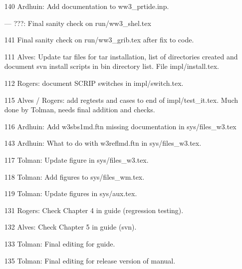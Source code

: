 \begin{itemize}
\item[140] Ardhuin: Add documentation to ww3\_prtide.inp.

\item[---] ???: Final sanity check on run/ww3\_shel.tex

\item[141] Final sanity check on run/ww3\_grib.tex after fix to code.

\item[111] Alves: Update tar files for tar installation, list of directories
  created and document svn install scripts in bin directory list. File
  impl/install.tex. 

\item[112] Rogers: document SCRIP switches in impl/switch.tex.

\item[115] Alves / Rogers: add regtests and cases to end of
  impl/test\_it.tex. Much done by Tolman, needs final addition and checks. 

\item[116] Ardhuin: Add w3sbs1md.ftn missing documentation in sys/files\_w3.tex

\item[143] Ardhuin: What to do with w3reflmd.ftn in sys/files\_w3.tex.

\item[117] Tolman: Update figure in sys/files\_w3.tex.

\item[118] Tolman: Add figures to sys/files\_wm.tex.

\item[119] Tolman: Update figures in sys/aux.tex.

\item [131] Rogers: Check Chapter 4 in guide (regression testing).

\item [132] Alves: Check Chapter 5 in guide (svn).

\item [133] Tolman: Final editing for guide. 

\item [135] Tolman: Final editing for release version of manual.

\end{itemize}

\bpage
\pagestyle{empty}
